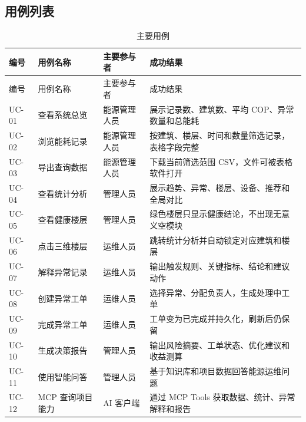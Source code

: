 \documentclass[12pt,a4paper]{ctexart}
\begin{document}
\subsection{用例列表}
\begin{longtable}{p{2cm}p{3.2cm}p{3cm}p{5.8cm}}
\caption{主要用例}\\
\toprule
编号 & 用例名称 & 主要参与者 & 成功结果 \\
\midrule
\endfirsthead
\toprule
编号 & 用例名称 & 主要参与者 & 成功结果 \\
\midrule
\endhead
UC-01 & 查看系统总览 & 能源管理人员 & 展示记录数、建筑数、平均 COP、异常数量和总能耗 \\
UC-02 & 浏览能耗记录 & 能源管理人员 & 按建筑、楼层、时间和数量筛选记录，表格字段完整 \\
UC-03 & 导出查询数据 & 能源管理人员 & 下载当前筛选范围 CSV，文件可被表格软件打开 \\
UC-04 & 查看统计分析 & 管理人员 & 展示趋势、异常、楼层、设备、推荐和全局对比 \\
UC-05 & 查看健康楼层 & 管理人员 & 绿色楼层只显示健康结论，不出现无意义空模块 \\
UC-06 & 点击三维楼层 & 运维人员 & 跳转统计分析并自动锁定对应建筑和楼层 \\
UC-07 & 解释异常记录 & 运维人员 & 输出触发规则、关键指标、结论和建议动作 \\
UC-08 & 创建异常工单 & 运维人员 & 选择异常、分配负责人，生成处理中工单 \\
UC-09 & 完成异常工单 & 运维人员 & 工单变为已完成并持久化，刷新后仍保留 \\
UC-10 & 生成决策报告 & 管理人员 & 输出风险摘要、工单状态、优化建议和收益测算 \\
UC-11 & 使用智能问答 & 管理人员 & 基于知识库和项目数据回答能源运维问题 \\
UC-12 & MCP 查询项目能力 & AI 客户端 & 通过 MCP Tools 获取数据、统计、异常解释和报告 \\
\bottomrule
\end{longtable}
\end{document}
